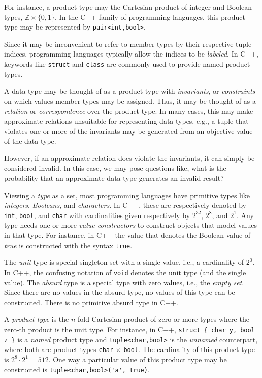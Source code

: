 \documentclass[11pt,final,hidelinks]{article}
\newcommand{\Z}{\mathbb{Z}}        %
\theoremstyle{plain}
\newenvironment{remark}
  {\pushQED{\qed}\renewcommand{\qedsymbol}{$\triangle$}\remarkx}
  {\popQED\endremarkx}
\begin{document}
For instance, a product type may the Cartesian product of integer and Boolean types, $\Z \times \{0,1\}$. In the C++ family of programming languages, this product type may be represented by \texttt{pair<int,bool>}.

Since it may be inconvenient to refer to member types by their respective tuple indices, programming languages typically allow the indices to be \emph{labeled}. In C++, keywords like \texttt{struct} and \texttt{class} are commonly used to provide named product types.

A data type may be thought of as a product type with \emph{invariants}, or \emph{constraints} on which values member types may be assigned. Thus, it may be thought of as a \emph{relation} or \emph{correspondence} over the product type. In many cases, this may make approximate relations unsuitable for representing data types, e.g., a tuple that violates one or more of the invariants may be generated from an objective value of the data type.

However, if an approximate relation does violate the invariants, it can simply be considered invalid. In this case, we may pose questions like, what is the probability that an approximate data type generates an invalid result?

Viewing a \emph{type} as a set, most programming languages have primitive types like \emph{integers}, \emph{Booleans}, and \emph{characters}.
In C++, these are respectively denoted by \lstinline{int}, \lstinline{bool}, and \lstinline{char} with cardinalities given respectively by $2^{32}$, $2^8$, and $2^1$.
Any type needs one or more \emph{value constructors} to construct objects that model values in that type.
For instance, in C++ the value that denotes the Boolean value of \emph{true} is constructed with the syntax \lstinline{true}.

The \emph{unit} type is special singleton set with a single value, i.e., a cardinality of $2^0$.
In C++, the confusing notation of \lstinline{void} denotes the unit type (and the single value).
\begin{remark}
The \emph{absurd} type is a special type with zero values, i.e., the \emph{empty set}.
Since there are no values in the absurd type, no values of this type can be constructed.
There is no primitive absurd type in C++.
\end{remark}

A \emph{product type} is the $n$-fold Cartesian product of zero or more types where the zero-th product is the unit type.
For instance, in C++, \lstinline|struct { char y, bool z }| is a \emph{named} product type and \lstinline|tuple<char,bool>|
is the \emph{unnamed} counterpart, where both are product types \lstinline{char} $\times$ \lstinline{bool}.
The cardinality of this product type is $2^8 \cdot 2^1 = 512$.
One way a particular value of this product type may be constructed is \lstinline{tuple<char,bool>('a', true)}.
\end{document}
